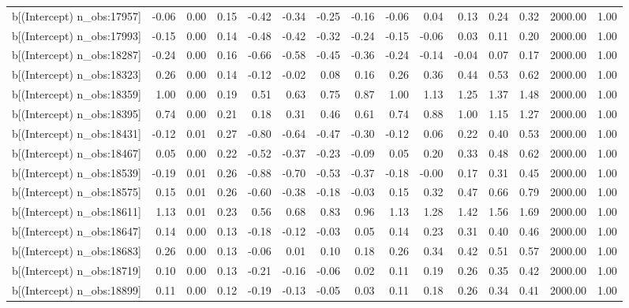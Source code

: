 \begin{table}[ht]
\begin{tabular}{rrrrrrrrrrrrrrr}
  b[(Intercept) n\_obs:17957] & -0.06 & 0.00 & 0.15 & -0.42 & -0.34 & -0.25 & -0.16 & -0.06 & 0.04 & 0.13 & 0.24 & 0.32 & 2000.00 & 1.00 \\ 
  b[(Intercept) n\_obs:17993] & -0.15 & 0.00 & 0.14 & -0.48 & -0.42 & -0.32 & -0.24 & -0.15 & -0.06 & 0.03 & 0.11 & 0.20 & 2000.00 & 1.00 \\ 
  b[(Intercept) n\_obs:18287] & -0.24 & 0.00 & 0.16 & -0.66 & -0.58 & -0.45 & -0.36 & -0.24 & -0.14 & -0.04 & 0.07 & 0.17 & 2000.00 & 1.00 \\ 
  b[(Intercept) n\_obs:18323] & 0.26 & 0.00 & 0.14 & -0.12 & -0.02 & 0.08 & 0.16 & 0.26 & 0.36 & 0.44 & 0.53 & 0.62 & 2000.00 & 1.00 \\ 
  b[(Intercept) n\_obs:18359] & 1.00 & 0.00 & 0.19 & 0.51 & 0.63 & 0.75 & 0.87 & 1.00 & 1.13 & 1.25 & 1.37 & 1.48 & 2000.00 & 1.00 \\ 
  b[(Intercept) n\_obs:18395] & 0.74 & 0.00 & 0.21 & 0.18 & 0.31 & 0.46 & 0.61 & 0.74 & 0.88 & 1.00 & 1.15 & 1.27 & 2000.00 & 1.00 \\ 
  b[(Intercept) n\_obs:18431] & -0.12 & 0.01 & 0.27 & -0.80 & -0.64 & -0.47 & -0.30 & -0.12 & 0.06 & 0.22 & 0.40 & 0.53 & 2000.00 & 1.00 \\ 
  b[(Intercept) n\_obs:18467] & 0.05 & 0.00 & 0.22 & -0.52 & -0.37 & -0.23 & -0.09 & 0.05 & 0.20 & 0.33 & 0.48 & 0.62 & 2000.00 & 1.00 \\ 
  b[(Intercept) n\_obs:18539] & -0.19 & 0.01 & 0.26 & -0.88 & -0.70 & -0.53 & -0.37 & -0.18 & -0.00 & 0.17 & 0.31 & 0.45 & 2000.00 & 1.00 \\ 
  b[(Intercept) n\_obs:18575] & 0.15 & 0.01 & 0.26 & -0.60 & -0.38 & -0.18 & -0.03 & 0.15 & 0.32 & 0.47 & 0.66 & 0.79 & 2000.00 & 1.00 \\ 
  b[(Intercept) n\_obs:18611] & 1.13 & 0.01 & 0.23 & 0.56 & 0.68 & 0.83 & 0.96 & 1.13 & 1.28 & 1.42 & 1.56 & 1.69 & 2000.00 & 1.00 \\ 
  b[(Intercept) n\_obs:18647] & 0.14 & 0.00 & 0.13 & -0.18 & -0.12 & -0.03 & 0.05 & 0.14 & 0.23 & 0.31 & 0.40 & 0.46 & 2000.00 & 1.00 \\ 
  b[(Intercept) n\_obs:18683] & 0.26 & 0.00 & 0.13 & -0.06 & 0.01 & 0.10 & 0.18 & 0.26 & 0.34 & 0.42 & 0.51 & 0.57 & 2000.00 & 1.00 \\ 
  b[(Intercept) n\_obs:18719] & 0.10 & 0.00 & 0.13 & -0.21 & -0.16 & -0.06 & 0.02 & 0.11 & 0.19 & 0.26 & 0.35 & 0.42 & 2000.00 & 1.00 \\ 
  b[(Intercept) n\_obs:18899] & 0.11 & 0.00 & 0.12 & -0.19 & -0.13 & -0.05 & 0.03 & 0.11 & 0.18 & 0.26 & 0.34 & 0.41 & 2000.00 & 1.00 \\ 

\end{tabular}
\end{table}
